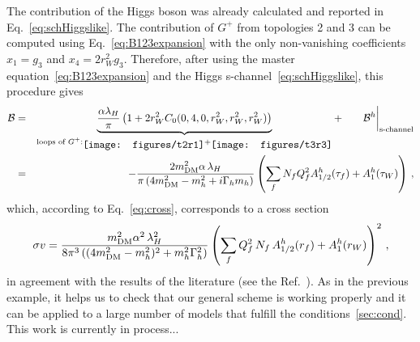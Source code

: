 The contribution of the Higgs boson was already calculated and reported in Eq.~\eqref{eq:schHiggslike}. The contribution of $G^+$ from topologies 2 and 3 can be computed using Eq.~\ref{eq:B123expansion} with the only non-vanishing coefficients $x_1= g_3$ and  $x_4 =2 r_W^2 g_3$. 
Therefore, after using the master equation~\eqref{eq:B123expansion} and the Higgs s-channel~\ref{eq:schHiggslike}, this procedure gives
%
\begin{eqnarray}
{\cal B}&=& \underbrace{\frac{\alpha  \lambda_H}{\pi}  \left(1+2 r_W^2  C_0(0,4,0,r_W^2,r_W^2,r_W^2)\right)}_{\text{loops of $G^+$:}
\raisebox{-.5\height}{\texttt{[image: figures/t2r1]}}+
\raisebox{-.5\height}{\texttt{[image: figures/t3r3]}}
}+
\hspace{20pt}{\cal B}^h\bigg|_\text{s-channel}\nonumber\\
&=& -\dfrac{2 \mDM^2\alpha\,\lambda_H }{\pi \left(4\mDM^2-m_h^2 + i \Gamma_h m_h\right)} 
\left(\sum_f N_f Q_f^2 A^h_{1/2}(\tau_f)
+A^h_{1}(\tau_W) \right)\,,
\end{eqnarray}
which, according to Eq.~\eqref{eq:cross}, corresponds to a cross section
\begin{eqnarray}
\sigma v= \dfrac{ m_{\text{DM}}^2\alpha^2\,\lambda_H^2 }{8\pi^3 \left( (4m_{\text{DM}}^2-m_h^2)^2 + m_h^2 \Gamma_h^2 \right)}
\left(\sum_f  Q_f^2\, N_f\,  A^h_{1/2}(r_f) + A^h_1(r_W)\right)^2\,,
\end{eqnarray}
in agreement with the results of the literature (see the Ref.~\cite{Duerr:2015aka}).
%
As in the previous example, it helps us to check that our general scheme is working properly and it can be applied to a large number of models that fulfill the conditions~\ref{sec:cond}. This work is currently in process...












